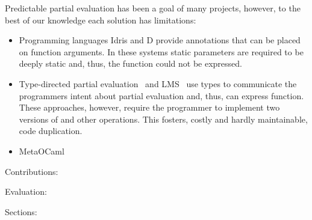 Predictable partial evaluation has been a goal of many projects, however, to the best of our knowledge each solution has limitations:
\begin{itemize}
\item Programming languages Idris and D provide annotations  that can be placed on function arguments. In these systems static parameters are required to be deeply static and, thus, the  function could not be expressed.
\item Type-directed partial evaluation~\cite{danvy1999type} and LMS~\cite{rompf2012lightweight} use types to communicate the programmers intent about partial evaluation and, thus, can express  function. These approaches, however, require the programmer to implement two versions of  and other operations. This fosters, costly and hardly maintainable, code duplication.
\item MetaOCaml
\end{itemize}

Contributions:

Evaluation:

Sections:
